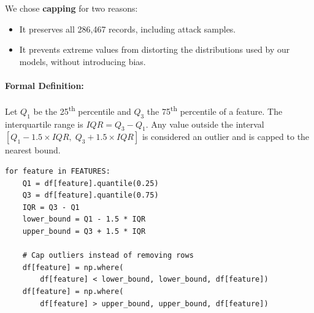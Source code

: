 We chose \textbf{capping} for two reasons:
\begin{itemize}
    \item It preserves all 286,467 records, including attack samples.
    \item It prevents extreme values from distorting the distributions used by our models, without introducing bias.
\end{itemize}

\paragraph{Formal Definition:} Let $Q_1$ be the 25\textsuperscript{th} percentile and $Q_3$ the 75\textsuperscript{th} percentile of a feature. The interquartile range is $IQR = Q_3 - Q_1$. Any value outside the interval $[Q_1 - 1.5 \times IQR,\; Q_3 + 1.5 \times IQR]$ is considered an outlier and is capped to the nearest bound.

\begin{lstlisting}[caption={Outlier capping using the IQR method}]
for feature in FEATURES:
    Q1 = df[feature].quantile(0.25)
    Q3 = df[feature].quantile(0.75)
    IQR = Q3 - Q1
    lower_bound = Q1 - 1.5 * IQR
    upper_bound = Q3 + 1.5 * IQR

    # Cap outliers instead of removing rows
    df[feature] = np.where(
        df[feature] < lower_bound, lower_bound, df[feature])
    df[feature] = np.where(
        df[feature] > upper_bound, upper_bound, df[feature])
\end{lstlisting}

